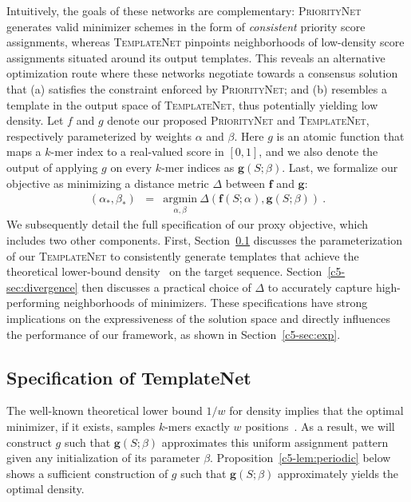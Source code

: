 Intuitively, the goals of these networks are complementary: \textsc{PriorityNet} generates valid minimizer schemes in the form of \textit{consistent} priority score assignments, whereas \textsc{TemplateNet} pinpoints neighborhoods of low-density score assignments situated around its output templates. This reveals an alternative optimization route where these networks negotiate towards a consensus solution that (a) satisfies the constraint enforced by \textsc{PriorityNet}; and (b) resembles a template in the output space of \textsc{TemplateNet}, thus potentially yielding low density. Let $f$ and $g$ denote our proposed \textsc{PriorityNet} and \textsc{TemplateNet}, respectively parameterized by weights $\alpha$ and ${\beta}$. Here $g$ is an atomic function that maps a $k$-mer index to a real-valued score in $[0, 1]$, and we also denote the output of applying $g$ on every $k$-mer indices as $\mathbf{g}(S;\beta)$. Last, we formalize our objective as minimizing a distance metric $\Delta$ between $\mathbf{f}$ and $\mathbf{g}$:
\begin{eqnarray}
(\alpha_\ast, \beta_\ast) &=& \underset{\alpha,\beta}{\mathrm{argmin}} \ \Delta\left(\mathbf{f}(S;\alpha),\mathbf{g}(S;{\beta})\right) \ .
\label{eq:proxy}
\end{eqnarray}  
We subsequently detail the full specification of our proxy objective, which includes two other components. First, Section~\ref{c5-sec:template} discusses the parameterization of our \textsc{TemplateNet} to consistently generate templates that achieve the theoretical lower-bound density~\citep{marcais17} on the target sequence. Section~\ref{c5-sec:divergence} then discusses a practical choice of $\Delta$ to accurately capture high-performing neighborhoods of minimizers. These specifications have strong implications on the expressiveness of the solution space and directly influences the performance of our framework, as shown in Section~\ref{c5-sec:exp}.


\subsection{Specification of TemplateNet}
\label{c5-sec:template}
The well-known theoretical lower bound $1/w$ for density implies that the optimal minimizer, if it exists, samples $k$-mers exactly $w$ positions~\citep{marcais17}. As a result, we will construct $g$ such that $\mathbf{g}(S;\beta)$ approximates this uniform assignment pattern given any initialization of its parameter $\beta$. Proposition~\ref{c5-lem:periodic} below shows a sufficient construction of $g$ such that $\mathbf{g}(S; \beta)$ approximately yields the optimal density.

